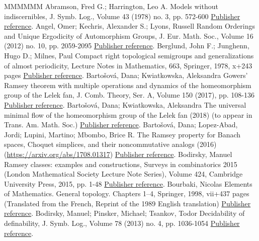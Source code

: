\documentclass[11pt]{article}
\theoremstyle{definition}
\numberwithin{equation}{section}
\numberwithin{figure}{section}
\numberwithin{table}{section}
\begin{document}
\begin{thebibliography}{MMMMMM}
 Abramson, Fred G.; Harrington, Leo A. Models without indiscernibles, J. Symb. Log., Volume 43 (1978) no. 3, pp. 572-600 \href{https://ahl.centre-mersenne.org/item/AHL_2019__2__149_0/#AH}{Publisher reference}.
 Angel, Omer; Kechris, Alexander S.; Lyons, Russell Random Orderings and Unique Ergodicity of Automorphism Groups, J. Eur. Math. Soc., Volume 16 (2012) no. 10, pp. 2059-2095 \href{https://ahl.centre-mersenne.org/item/AHL_2019__2__149_0/#AKL}{Publisher reference}.
 Berglund, John F.; Junghenn, Hugo D.; Milnes, Paul Compact right topological semigroups and generalizations of almost periodicity, Lecture Notes in Mathematics, 663, Springer, 1978, x+243 pages \href{https://ahl.centre-mersenne.org/item/AHL_2019__2__149_0/#BJM}{Publisher reference}.
 Bartošová, Dana; Kwiatkowska, Aleksandra Gowers’ Ramsey theorem with multiple operations and dynamics of the homeomorphism group of the Lelek fan, J. Comb. Theory, Ser. A, Volume 150 (2017), pp. 108-136 \href{https://ahl.centre-mersenne.org/item/AHL_2019__2__149_0/#BaK2}{Publisher reference}.
 Bartošová, Dana; Kwiatkowska, Aleksandra The universal minimal flow of the homeomorphism group of the Lelek fan (2018) (to appear in Trans. Am. Math. Soc.) \href{https://ahl.centre-mersenne.org/item/AHL_2019__2__149_0/#BaK3}{Publisher reference}.
 Bartošová, Dana; Lopez-Abad, Jordi; Lupini, Martino; Mbombo, Brice R. The Ramsey property for Banach spaces, Choquet simplices, and their noncommutative analogs (2016) (\url{https://arxiv.org/abs/1708.01317}) \href{https://ahl.centre-mersenne.org/item/AHL_2019__2__149_0/#BLLM}{Publisher reference}.
 Bodirsky, Manuel Ramsey classes: examples and constructions, Surveys in combinatorics 2015 (London Mathematical Society Lecture Note Series), Volume 424, Cambridge University Press, 2015, pp. 1-48 \href{https://ahl.centre-mersenne.org/item/AHL_2019__2__149_0/#Bod2}{Publisher reference}.
 Bourbaki, Nicolas Elements of Mathematics. General topology. Chapters 1–4, Springer, 1998, vii+437 pages (Translated from the French, Reprint of the 1989 English translation) \href{https://ahl.centre-mersenne.org/item/AHL_2019__2__149_0/#Bou}{Publisher reference}.
 Bodirsky, Manuel; Pinsker, Michael; Tsankov, Todor Decidability of definability, J. Symb. Log., Volume 78 (2013) no. 4, pp. 1036-1054 \href{https://ahl.centre-mersenne.org/item/AHL_2019__2__149_0/#BPT}{Publisher reference}.

\end{thebibliography}
\end{document}
